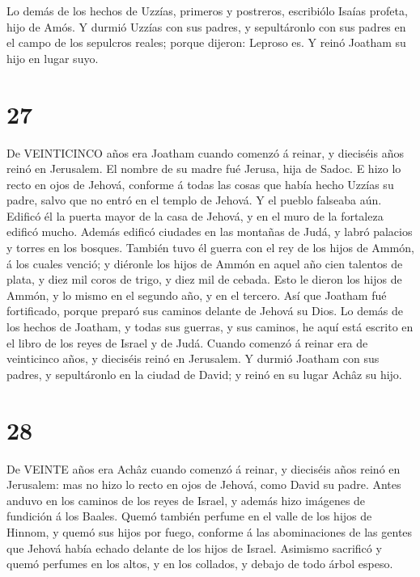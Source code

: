 Lo demás de los hechos de Uzzías, primeros y postreros,
escribiólo Isaías profeta, hijo de Amós.  Y durmió Uzzías
con sus padres, y sepultáronlo con sus padres en el campo de los
sepulcros reales; porque dijeron: Leproso es. Y reinó Joatham su hijo en
lugar suyo.

\hypertarget{section-26}{%
\section{27}\label{section-26}}

 De VEINTICINCO años era Joatham cuando comenzó á reinar, y
dieciséis años reinó en Jerusalem. El nombre de su madre fué Jerusa,
hija de Sadoc.  E hizo lo recto en ojos de Jehová, conforme
á todas las cosas que había hecho Uzzías su padre, salvo que no entró en
el templo de Jehová. Y el pueblo falseaba aún.  Edificó él
la puerta mayor de la casa de Jehová, y en el muro de la fortaleza
edificó mucho.  Además edificó ciudades en las montañas de
Judá, y labró palacios y torres en los bosques.  También
tuvo él guerra con el rey de los hijos de Ammón, á los cuales venció; y
diéronle los hijos de Ammón en aquel año cien talentos de plata, y diez
mil coros de trigo, y diez mil de cebada. Esto le dieron los hijos de
Ammón, y lo mismo en el segundo año, y en el tercero.  Así
que Joatham fué fortificado, porque preparó sus caminos delante de
Jehová su Dios.  Lo demás de los hechos de Joatham, y todas
sus guerras, y sus caminos, he aquí está escrito en el libro de los
reyes de Israel y de Judá.  Cuando comenzó á reinar era de
veinticinco años, y dieciséis reinó en Jerusalem.  Y durmió
Joatham con sus padres, y sepultáronlo en la ciudad de David; y reinó en
su lugar Achâz su hijo.

\hypertarget{section-27}{%
\section{28}\label{section-27}}

 De VEINTE años era Achâz cuando comenzó á reinar, y
dieciséis años reinó en Jerusalem: mas no hizo lo recto en ojos de
Jehová, como David su padre.  Antes anduvo en los caminos de
los reyes de Israel, y además hizo imágenes de fundición á los Baales.
 Quemó también perfume en el valle de los hijos de Hinnom, y
quemó sus hijos por fuego, conforme á las abominaciones de las gentes
que Jehová había echado delante de los hijos de Israel. 
Asimismo sacrificó y quemó perfumes en los altos, y en los collados, y
debajo de todo árbol espeso.

